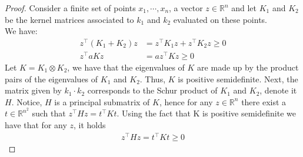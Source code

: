 \begin{proof}
    Consider a finite set of points $x_1, \cdots, x_n$, a vector $z \in \mathbb{R}^n$ and let $K_1$ and $K_2$ be the kernel matrices associated to $k_1$ and $k_2$ evaluated on these points.
    \\
    We have:
    \\
    $$  
    \begin{aligned}
    z^\intercal (K_1+K_2) z&= z^\intercal K_1 z + z^\intercal K_2 z \geq 0
    \\
    z^\intercal aK z&= a z^\intercal K z \geq 0
    \end{aligned}
    $$
    Let $K=K_1 \otimes K_2$, we have that the eigenvalues of $K$ are made up by the product pairs of the eigenvalues of $K_1$ and $K_2$. Thus, $K$ is positive semidefinite. Next, the matrix given by $k_1 \cdot k_2$ corresponds to the Schur product of $K_1$ and $K_2$, denote it $H$. Notice, $H$ is a principal submatrix of $K$, hence for any $z \in \mathbb{R}^n$ there exist a $t \in \mathbb{R}^{n^2}$ such that $z^\intercal H z= t^\intercal K t$. Using the fact that K is positive semidefinite we have that for any $z$, it holds 
    $$
    \begin{aligned}
        z^\intercal H z= t^\intercal K t\geq 0
    \end{aligned}
    $$
\end{proof}

